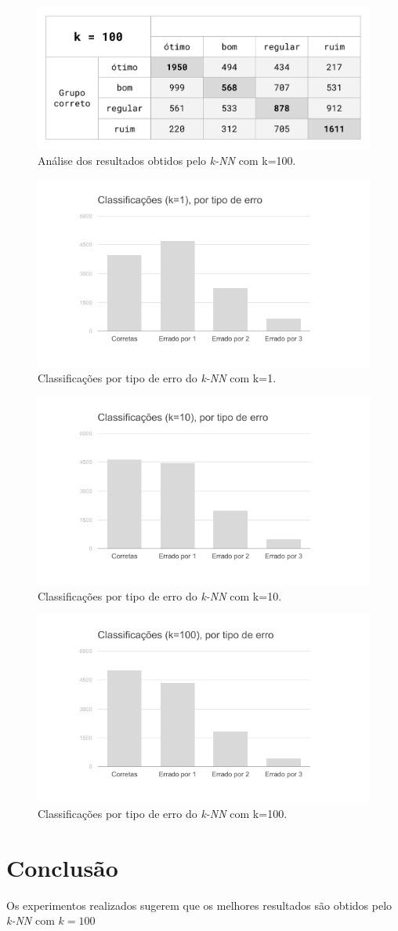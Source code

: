 \documentclass[12pt]{article}
\begin{document}
\begin{figure}[H]
\centering\includegraphics[width=.60\linewidth]{plot-white100.png}
\caption{Análise dos resultados obtidos pelo \emph{k-NN} com k=100.}
\label{fig:tab100}
\end{figure}

\begin{figure}[H]
\centering\includegraphics[width=.65\linewidth]{graf-white1.png}
\caption{Classificações por tipo de erro do \emph{k-NN} com k=1.}
\label{fig:graf1}
\end{figure}

\begin{figure}[H]
\centering\includegraphics[width=.65\linewidth]{graf-white10.png}
\caption{Classificações por tipo de erro do \emph{k-NN} com k=10.}
\label{fig:graf10}
\end{figure}

\begin{figure}[H]
\centering\includegraphics[width=.65\linewidth]{graf-white100.png}
\caption{Classificações por tipo de erro do \emph{k-NN} com k=100.}
\label{fig:graf100}
\end{figure}

\section{Conclusão}
\label{sec:conclusao}
Os experimentos realizados sugerem que os melhores resultados são obtidos pelo \emph{k-NN} com $k=100$
\end{document}
